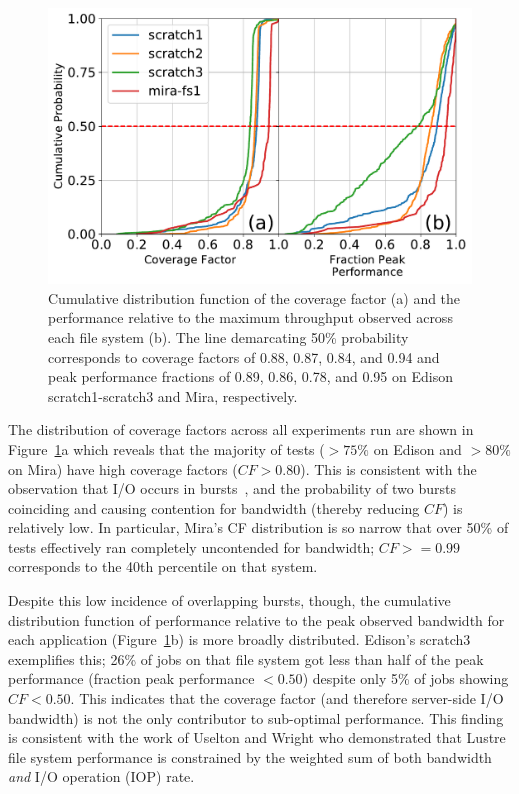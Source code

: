 \begin{figure}[t]
    \centering
    \includegraphics[width=\columnwidth]{figs/cdf-both.pdf}
    \caption{Cumulative distribution function of the coverage factor (a) and the    performance relative to the maximum throughput observed across each file system (b).
    The line demarcating 50\% probability corresponds to coverage factors of 0.88, 0.87, 0.84, and 0.94 and peak performance fractions of 0.89, 0.86, 0.78, and 0.95 on Edison scratch1-scratch3 and Mira, respectively.}
    \label{fig:cdfs}
\vspace{-.2in}
\end{figure}

The distribution of coverage factors across all experiments run are shown in Figure~\ref{fig:cdfs}a which reveals that the majority of tests ($> 75\%$ on Edison and $> 80\%$ on Mira) have high coverage factors ($\mathit{CF} > 0.80$).
This is consistent with the observation that I/O occurs in bursts~\cite{Carns2011,Liu2016}, and the probability of two bursts coinciding and causing contention for bandwidth (thereby reducing $\mathit{CF}$) is relatively low.
In particular, Mira's CF distribution is so narrow that over 50\% of tests effectively ran completely uncontended for bandwidth; $\mathit{CF} >= 0.99$ corresponds to the 40th percentile on that system.

Despite this low incidence of overlapping bursts, though, the cumulative
distribution function of performance relative to the peak observed
bandwidth for each application (Figure~\ref{fig:cdfs}b) is more broadly distributed.
Edison's scratch3 exemplifies this; 26\% of jobs on that file system got less than half of the peak performance (fraction peak performance $< 0.50$) despite only 5\% of jobs showing $\mathit{CF} < 0.50$.  This indicates that the coverage factor (and therefore server-side I/O bandwidth) is not the only contributor to sub-optimal performance.  
This finding is consistent with the work of Uselton and Wright\cite{Uselton2013} who demonstrated that Lustre file system performance is constrained by the weighted sum of both bandwidth \emph{and} I/O operation (IOP) rate.  

